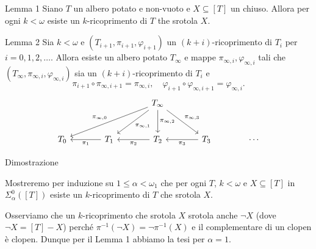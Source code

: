 \documentclass[aspectratio=43]{beamer}
\begin{document}
\begin{frame}
  \begin{block}{Lemma 1}
    Siano \(T\) un albero potato e non-vuoto e \(X \subseteq [T]\) un chiuso.
    Allora per ogni \(k < \omega\) esiste un \(k\)-ricoprimento di \(T\) the srotola \(X\).
  \end{block}
  \pause
  \begin{block}{Lemma 2}
    Sia \(k < \omega\) e \((T_{i+1}, \pi_{i+1}, \varphi_{i+1})\) un \((k + i)\)-ricoprimento di \(T_i\) per \(i = 0, 1, 2, \ldots\).
    Allora esiste un albero potato \(T_\infty\) e mappe \(\pi_{\infty, i}, \varphi_{\infty, i}\) tali che \((T_\infty, \pi_{\infty, i}, \varphi_{\infty, i})\) sia un \((k+i)\)-ricoprimento di \(T_i\) e
    \begin{equation*}
      \pi_{i+1} \circ \pi_{\infty, i+1} = \pi_{\infty, i}, \quad \varphi_{i+1} \circ \varphi_{\infty, i+1} = \varphi_{\infty, i}.
    \end{equation*}
    \begin{equation*}
      \begin{tikzcd}[sep = large, ampersand replacement=\&]
        \& \& T_\infty \ar[lld, "\pi_{\infty, 0}"'] \ar[ld, "\pi_{\infty, 1}"] \ar[d, "\pi_{\infty, 2}"] \ar[rd, "\pi_{\infty, 3}"] \& \&\\
        T_0 \& T_1 \ar[l, "\pi_1"] \& T_2 \ar[l, "\pi_2"] \& T_3 \ar[l, "\pi_3"] \& \cdots
      \end{tikzcd}
    \end{equation*}
  \end{block}
\end{frame}

\begin{frame}{Dimostrazione}
  \begin{block}{}
    Mostreremo per induzione su \(1 \leq \alpha < \omega_1\) che per ogni \(T\), \(k < \omega\) e \(X \subseteq [T]\) in \(\Sigma^0_\alpha([T])\) esiste un \(k\)-ricoprimento di \(T\) che srotola \(X\).    
  \end{block}
  \pause
  \begin{block}{}
    Osserviamo che un \(k\)-ricoprimento che srotola \(X\) srotola anche \(\neg X\) (dove \(\neg X = [T] - X\)) perché \(\pi^{-1}(\neg X) = \neg\pi^{-1}(X)\) e il complementare di un clopen è clopen.
    Dunque per il Lemma 1 abbiamo la tesi per \(\alpha = 1\).    
  \end{block}
  \end{frame}
\end{document}
